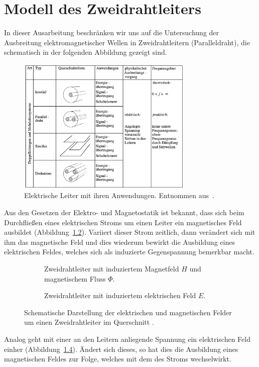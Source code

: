 \documentclass[paper=a4, parskip=half-, ngerman, fontsize=11pt]{scrreprt}
\begin{document}
\chapter{Modell des Zweidrahtleiters}

In dieser Ausarbeitung beschränken wir uns auf die Untersuchung der Ausbreitung elektromagnetischer Wellen in
Zweidrahtleitern (Paralleldraht), die schematisch in der folgenden Abbildung gezeigt sind.
\begin{figure}[!htb]
    \begin{center}
        \includegraphics[width=0.75\textwidth]{images/Leiter.png}
        \caption{Elektrische Leiter mit ihren Anwendungen. Entnommen aus~\cite{FernuniSkript}.}
        \label{Leiter}
    \end{center}
\end{figure}

Aus den Gesetzen der Elektro- und Magnetostatik ist bekannt, dass sich beim Durchfließen eines elektrischen Stroms um
einen Leiter ein magnetisches Feld ausbildet (Abbildung~\ref{Felder1}). Variiert dieser Strom zeitlich, dann
verändert sich mit ihm das magnetische Feld und dies wiederum bewirkt die Ausbildung eines elektrischen Feldes, welches
sich als induzierte Gegenspannung bemerkbar macht.
\begin{figure}[!htb]
    \begin{subfigure}[t]{0.49\textwidth}
        \centering
        
        \caption{Zweidrahtleiter mit induziertem Magnetfeld $H$ und magnetischem Fluss $\Phi$.}
        \label{Felder1}
    \end{subfigure}%
    \hfill
    \begin{subfigure}[t]{0.49\textwidth}
        \centering
        
        \caption{Zweidrahtleiter mit induziertem elektrischen Feld $E$.}
        \label{Felder2}
    \end{subfigure}
    \caption{Schematische Darstellung der elektrischen und magnetischen Felder um einen Zweidrahtleiter im Querschnitt
    .}
\end{figure}
Analog geht mit einer an den Leitern anliegende Spannung ein elektrischen Feld einher (Abbildung~\ref{Felder2}).
Ändert sich dieses, so hat dies die Ausbildung eines magnetischen Feldes zur Folge, welches mit dem des Stroms
wechselwirkt.
\end{document}
